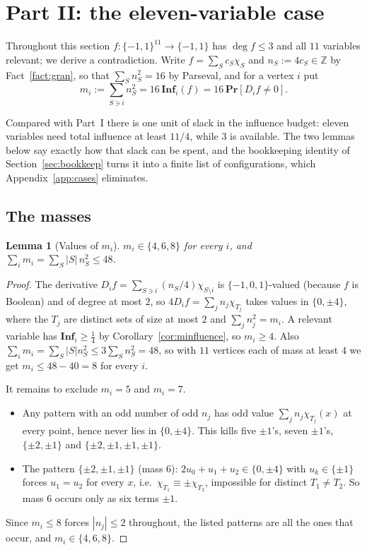 \documentclass[11pt,reqno]{amsart}
\theoremstyle{plain}
\newtheorem{lemma}[theorem]{Lemma}
\theoremstyle{definition}
\numberwithin{theorem}{section}
\newcommand{\cube}{\{-1,1\}}
\newcommand{\bits}{\{-1,0,1\}}
\newcommand{\Inf}{\mathbf{Inf}}
\newcommand{\Prb}{\mathbf{Pr}}
\newcommand{\bbZ}{\mathbb{Z}}
\DeclareMathOperator{\Deg}{deg}
\begin{document}
\section{Part II: the eleven-variable case}\label{sec:partII}

Throughout this section $f \colon \cube^{11} \to \cube$ has $\Deg f \le 3$ and all $11$
variables relevant; we derive a contradiction. Write $f = \sum_S c_S \chi_S$ and
$n_S := 4 c_S \in \bbZ$ by Fact~\ref{fact:gran}, so that $\sum_S n_S^2 = 16$ by Parseval, and
for a vertex $i$ put
\[
  m_i := \sum_{S \ni i} n_S^2 = 16\,\Inf_i(f) = 16\,\Prb[D_i f \ne 0].
\]

Compared with Part~I there is one unit of slack in the influence budget: eleven variables need
total influence at least $11/4$, while $3$ is available. The two lemmas below say exactly how
that slack can be spent, and the bookkeeping identity of Section~\ref{sec:bookkeep} turns it
into a finite list of configurations, which Appendix~\ref{app:cases} eliminates.

\subsection{The masses}

\begin{lemma}[Values of $m_i$]\label{lem:masses}
$m_i \in \{4, 6, 8\}$ for every $i$, and $\sum_i m_i = \sum_S |S|\,n_S^2 \le 48$.
\end{lemma}

\begin{proof}
The derivative $D_i f = \sum_{S \ni i} (n_S/4)\chi_{S \setminus i}$ is $\bits$-valued (because
$f$ is Boolean) and of degree at most $2$, so
$4 D_i f = \sum_j n_j \chi_{T_j}$ takes values in $\{0, \pm 4\}$, where the $T_j$ are distinct
sets of size at most $2$ and $\sum_j n_j^2 = m_i$. A relevant variable has
$\Inf_i \ge \frac14$ by Corollary~\ref{cor:minfluence}, so $m_i \ge 4$. Also
$\sum_i m_i = \sum_S |S| n_S^2 \le 3\sum_S n_S^2 = 48$, so with $11$ vertices each of mass at
least $4$ we get $m_i \le 48 - 40 = 8$ for every $i$.

It remains to exclude $m_i = 5$ and $m_i = 7$.
\begin{itemize}[leftmargin=1.4em]
  \item Any pattern with an odd number of odd $n_j$ has odd value $\sum_j n_j \chi_{T_j}(x)$ at
  every point, hence never lies in $\{0, \pm4\}$. This kills five $\pm1$'s, seven $\pm1$'s,
  $\{\pm2,\pm1\}$ and $\{\pm2,\pm1,\pm1,\pm1\}$.
  \item The pattern $\{\pm2,\pm1,\pm1\}$ (mass $6$): $2u_0 + u_1 + u_2 \in \{0,\pm4\}$ with
  $u_k \in \{\pm1\}$ forces $u_1 = u_2$ for every $x$, i.e.\
  $\chi_{T_1} \equiv \pm \chi_{T_2}$, impossible for distinct $T_1 \ne T_2$. So mass $6$ occurs
  only as six terms $\pm1$.
\end{itemize}
Since $m_i \le 8$ forces $|n_j| \le 2$ throughout, the listed patterns are all the ones that
occur, and $m_i \in \{4,6,8\}$.
\end{proof}
\end{document}
